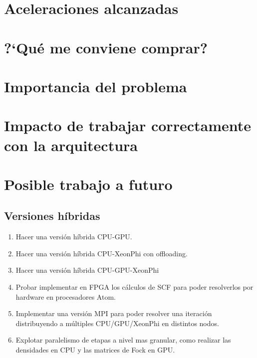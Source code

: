 \section{Aceleraciones alcanzadas}
%


\section{?`Qu\'e me conviene comprar?}


\section{Importancia del problema}
\section{Impacto de trabajar correctamente con la arquitectura}
\section{Posible trabajo a futuro}

\subsection{Versiones h\'ibridas}
\begin{enumerate}
  \item Hacer una versi\'on h\'ibrida CPU-GPU.
  \item Hacer una versi\'on h\'ibrida CPU-XeonPhi con offloading.
  \item Hacer una versi\'on h\'ibrida CPU-GPU-XeonPhi
  \item Probar implementar en FPGA los c\'alculos de SCF para poder resolverlos por hardware en procesadores
    Atom.
  \item Implementar una versi\'on MPI para poder resolver una iteraci\'on distribuyendo
    a m\'ultiples CPU/GPU/XeonPhi en distintos nodos.
  \item Explotar paralelismo de etapas a nivel mas granular, como realizar las densidades en CPU y las matrices
    de Fock en GPU.
\end{enumerate}

